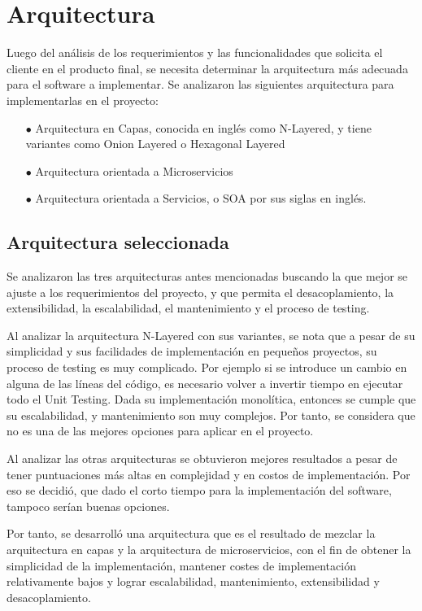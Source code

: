 \chapter{Arquitectura}

Luego del análisis de los requerimientos y las funcionalidades que solicita el cliente en el producto final, se necesita determinar la arquitectura más adecuada para el software a implementar. Se analizaron las siguientes arquitectura para implementarlas en el proyecto:

\begin{enumerate}
    \item[$\bullet$] Arquitectura en Capas, conocida en inglés como N-Layered, y tiene variantes como Onion Layered o Hexagonal Layered
    \item[$\bullet$] Arquitectura orientada a Microservicios
    \item[$\bullet$] Arquitectura orientada a Servicios, o SOA por sus siglas en inglés.
\end{enumerate}

\section{Arquitectura seleccionada}

Se analizaron las tres arquitecturas antes mencionadas buscando la que mejor se ajuste a los requerimientos del proyecto, y que permita el desacoplamiento, la extensibilidad, la escalabilidad, el mantenimiento y el proceso de testing. 

Al analizar la arquitectura N-Layered con sus variantes, se nota que a pesar de su simplicidad y sus facilidades de implementación en pequeños proyectos, su proceso de testing es muy complicado. Por ejemplo si se introduce un cambio en alguna de las líneas del código, es necesario volver a invertir tiempo en ejecutar todo el Unit Testing. Dada su implementación monolítica, entonces se cumple que su escalabilidad, y mantenimiento son muy complejos. Por tanto, se considera que no es una de las mejores opciones para aplicar en el proyecto.

Al analizar las otras arquitecturas se obtuvieron mejores resultados a pesar de tener puntuaciones más altas en complejidad y en costos de implementación. Por eso se decidió, que dado el corto tiempo para la implementación del software, tampoco serían buenas opciones.

Por tanto, se desarrolló una arquitectura que es el resultado de mezclar la arquitectura en capas y la arquitectura de microservicios, con el fin de obtener la simplicidad de la implementación, mantener costes de implementación relativamente bajos y lograr escalabilidad, mantenimiento, extensibilidad y desacoplamiento.
